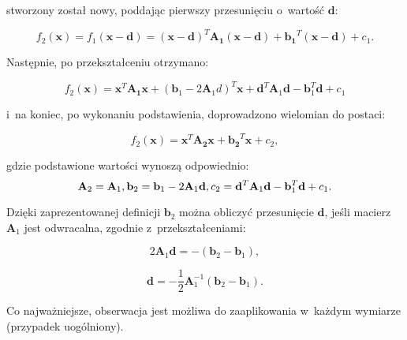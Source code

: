       stworzony został nowy, poddając pierwszy przesunięciu o~wartość $\mathbf{d}$:

        \begin{equation}
          f_{2}(\mathbf{x}) = f_{1}(\mathbf{x-d}) = (\mathbf{x-d})^{T}\mathbf{A_{1}}(\mathbf{x-d}) + \mathbf{b_{1}}^{T}(\mathbf{x-d}) + c_{1}.
        \end{equation}

      Następnie, po przekształceniu otrzymano:

        \begin{equation}
            f_{2}(\mathbf{x}) = \mathbf{x}^{T}\mathbf{A_{1}}\mathbf{x} + (\mathbf{b}_{1} - 2\mathbf{A}_{1}d)^{T}\mathbf{x} + \mathbf{d}^{T}\mathbf{A}_{1}\mathbf{d} - \mathbf{b}_{1}^{T}\mathbf{d} + c_{1}
        \end{equation}

      i~na koniec, po wykonaniu podstawienia, doprowadzono wielomian do postaci:

        \begin{equation}
            f_{2}(\mathbf{x}) = \mathbf{x}^{T}\mathbf{A_{2}}\mathbf{x} + \mathbf{b_{2}}^{T}\mathbf{x} + c_{2},
        \end{equation}

      gdzie podstawione wartości wynoszą odpowiednio:
        \begin{equation}
          \mathbf{A}_{2} = \mathbf{A}_{1}, \\
          \mathbf{b}_{2} = \mathbf{b}_{1} - 2\mathbf{A}_{1}\mathbf{d}, \\
          c_{2} = \mathbf{d}^{T}\mathbf{A}_{1}\mathbf{d} - \mathbf{b}_{1}^{T}\mathbf{d} + c_{1}.
        \end{equation}

      Dzięki zaprezentowanej definicji $\mathbf{b}_{2}$ można obliczyć przesunięcie $\mathbf{d}$, jeśli macierz $\mathbf{A}_{1}$ jest odwracalna, zgodnie z~przekształceniami:

        \begin{equation}\label{Equation_GeneralDenseOpticalFlow}
          2\mathbf{A}_{1}\mathbf{d} = -(\mathbf{b}_{2} - \mathbf{b}_{1}),
        \end{equation}

        \begin{equation}
          \mathbf{d} = -\frac{1}{2}\mathbf{A}_{1}^{-1}(\mathbf{b}_{2} - \mathbf{b}_{1}).
        \end{equation}

      Co najważniejsze, obserwacja jest możliwa do zaaplikowania w~każdym wymiarze (przypadek uogólniony).

